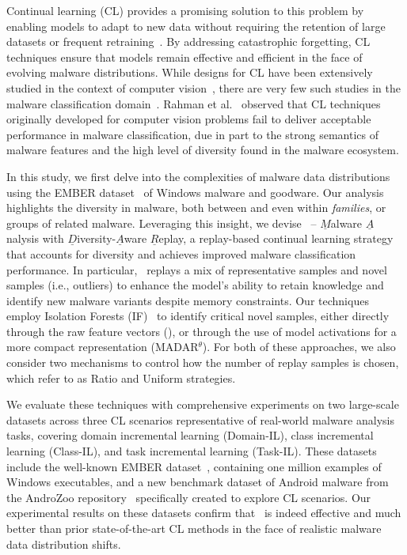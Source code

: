 Continual learning (CL) provides a promising solution to this problem by enabling models to adapt to new data without requiring the retention of large datasets or frequent retraining~\cite{malcl,wangunified, tamil, BIR, icarl, aljundi2019gradient}. By addressing catastrophic forgetting, CL techniques ensure that models remain effective and efficient in the face of evolving malware distributions. While designs for CL have been extensively studied in the context of computer vision~\cite{gr,hsu2018re,BIR}, there are very few such studies in the malware classification domain~\cite{continual-learning-malware, malcl}. Rahman et al.~\cite{continual-learning-malware} observed that CL techniques originally developed for computer vision problems fail to deliver acceptable performance in malware classification, due in part to the strong semantics of malware features and the high level of diversity found in the  malware ecosystem. 



In this study, we first delve into the complexities of malware data distributions using the EMBER dataset~\cite{ember} of Windows malware and goodware. Our analysis highlights the diversity in malware, both between and even within \emph{families}, or groups of related malware. Leveraging this insight, we devise \system\ -- $\underline{M}$alware $\underline{A}$nalysis with $\underline{D}$iversity-$\underline{A}$ware $\underline{R}$eplay, a replay-based continual learning strategy that accounts for diversity and achieves improved malware classification performance. In particular, \system\ replays a mix of representative samples and novel samples (i.e., outliers) to enhance the model's ability to retain knowledge and identify new malware variants despite memory constraints. Our techniques employ Isolation Forests (IF)~\cite{if} to identify critical novel samples, either directly through the raw feature vectors (\system), or through the use of model activations for a more compact representation (MADAR$^\theta$). For both of these approaches, we also consider two mechanisms to control how the number of replay samples is chosen, which refer to as Ratio and Uniform strategies.



We evaluate these techniques with comprehensive experiments on two large-scale datasets across three CL scenarios representative of real-world malware analysis tasks, covering domain incremental learning (Domain-IL), class incremental learning (Class-IL), and task incremental learning (Task-IL). These datasets include the well-known EMBER dataset~\cite{ember}, containing one million examples of Windows executables, and a new benchmark dataset of Android malware from the AndroZoo repository~\cite{AndroZoo} specifically created to explore CL scenarios. Our experimental results on these datasets confirm that \system\ is indeed effective and much better than prior state-of-the-art CL methods in the face of realistic malware data distribution shifts.

